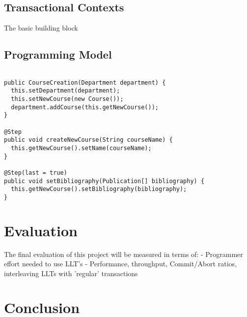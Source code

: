 \documentclass{llncs}
\begin{document}
\subsection{Transactional Contexts}

The basic building block 

\subsection{Programming Model}

\begin{lstlisting}

public CourseCreation(Department department) {
  this.setDepartment(department);
  this.setNewCourse(new Course());
  department.addCourse(this.getNewCourse());
}

@Step
public void createNewCourse(String courseName) {
  this.getNewCourse().setName(courseName);
}

@Step(last = true)
public void setBibliography(Publication[] bibliography) {
  this.getNewCourse().setBibliography(bibliography);
}
\end{lstlisting}

\section{Evaluation}

The final evaluation of this project will be measured in terms of:
- Programmer effort needed to use LLT's
- Performance, throughput, Commit/Abort ratios, interleaving LLTs with
'regular' transactions

\section{Conclusion}



\end{document}
